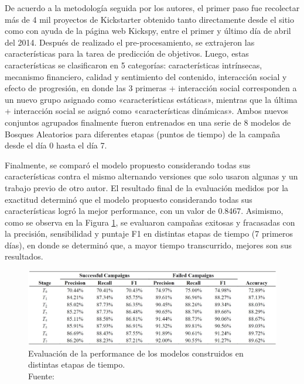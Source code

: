 De acuerdo a la metodología seguida por los autores, el primer paso fue recolectar más de 4 mil proyectos de Kickstarter obtenido tanto directamente desde el sitio como con ayuda de la página web Kickspy, entre el primer y último día de abril del 2014. Después de realizado el pre-procesamiento, se extrajeron las características para la tarea de predicción de objetivos. Luego, estas características se clasificaron en 5 categorías: características intrínsecas, mecanismo financiero, calidad y sentimiento del contenido, interacción social y efecto de progresión, en donde las 3 primeras + interacción social corresponden a un nuevo grupo asignado como «características estáticas», mientras que la última + interacción social se asignó como «características dinámicas». Ambos nuevos conjuntos agrupados finalmente fueron entrenados en una serie de 8 modelos de Bosques Aleatorios para diferentes etapas (puntos de tiempo) de la campaña desde el día 0 hasta el día 7.

Finalmente, se comparó el modelo propuesto considerando todas sus características contra el mismo alternando versiones que solo usaron algunas y un trabajo previo de otro autor. El resultado final de la evaluación medidos por la exactitud determinó que el modelo propuesto considerando todas sus características logró la mejor performance, con un valor de 0.8467. Asimismo, como se observa en la Figura \ref{2:fig114}, se evaluaron campañas exitosas y fracasadas con la precisión, sensibilidad y puntaje F1 en distintas etapas de tiempo (7 primeros días), en donde se determinó que, a mayor tiempo transcurrido, mejores son sus resultados.

\begin{figure}[!ht]
	\begin{center}
		\includegraphics[width=1\textwidth]{2/figures/chen2015.jpg}
		\caption[Evaluación de la performance de los modelos construidos en distintas etapas de tiempo]{Evaluación de la performance de los modelos construidos en distintas etapas de tiempo.\\
			Fuente: \cite{pr_chen2015predcrowd}}
		\label{2:fig114}
	\end{center}
\end{figure}

